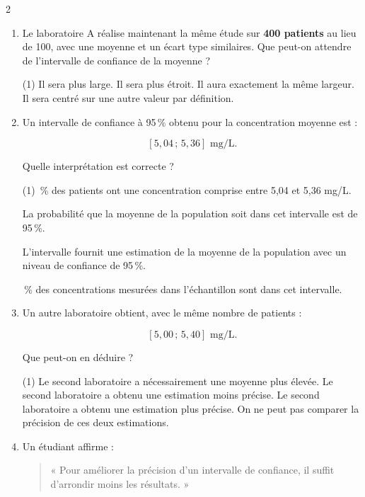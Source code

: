 \documentclass[10pt,a4paper]{article}
\begin{document}
\begin{multicols}{2}
\begin{exo}[QCM][]
\begin{enumerate}[label=\textbf{\arabic*.}, leftmargin=*]
    \item Le laboratoire A réalise maintenant la même étude sur \textbf{400 patients}
    au lieu de 100, avec une moyenne et un écart type similaires.
    Que peut-on attendre de l'intervalle de confiance de la moyenne ?

    \begin{tasks}(1)
        \task Il sera plus large.
        \task Il sera plus étroit.
        \task Il aura exactement la même largeur.
        \task Il sera centré sur une autre valeur par définition.
    \end{tasks}

    \item Un intervalle de confiance à 95\,\% obtenu pour la concentration moyenne est :

    \[
    [5,04\,;\,5,36]\text{ mg/L}.
    \]

    Quelle interprétation est correcte ?

    \begin{tasks}(1)
        \,\% des patients ont une concentration comprise entre 5,04 et 5,36 mg/L.
        
        \task La probabilité que la moyenne de la population soit dans cet intervalle est de 95\,\%.
        
        \task L'intervalle fournit une estimation de la moyenne de la population avec un niveau de confiance de 95\,\%.
        
        \,\% des concentrations mesurées dans l'échantillon sont dans cet intervalle.
    \end{tasks}

    \item Un autre laboratoire obtient, avec le même nombre de patients :

    \[
    [5,00\,;\,5,40]\text{ mg/L}.
    \]

    Que peut-on en déduire ?

    \begin{tasks}(1)
        \task Le second laboratoire a nécessairement une moyenne plus élevée.
        \task Le second laboratoire a obtenu une estimation moins précise.
        \task Le second laboratoire a obtenu une estimation plus précise.
        \task On ne peut pas comparer la précision de ces deux estimations.
    \end{tasks}

    \item Un étudiant affirme :

    \begin{quote}
        « Pour améliorer la précision d'un intervalle de confiance, il suffit d'arrondir moins les résultats. »
    \end{quote}


\end{enumerate}
\end{exo}
\end{multicols}
\end{document}
